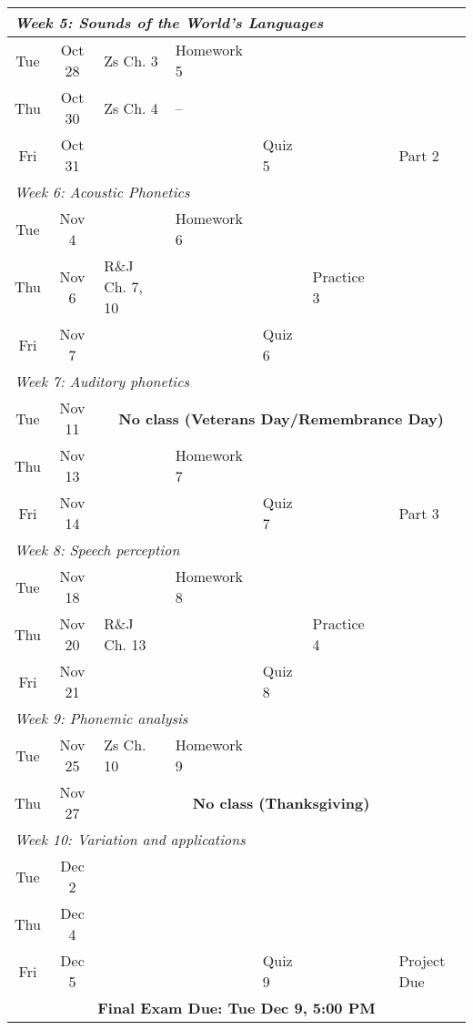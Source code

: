\documentclass[12pt, letterpaper]{article}
\begin{document}
\begin{longtable}{|c|c|l|p{3cm}|p{1.25cm}|l|l|l|}
\multicolumn{8}{|l|}{\textit{Week 5: Sounds of the World's Languages}} \\ \hline
Tue & Oct 28  & Zs Ch. 3 & Homework 5 & & & & \\ \hline
Thu & Oct 30  & Zs Ch. 4 & -- & & & & \\ \hline
Fri & Oct 31  & & & Quiz 5 & & & Part 2 \\ \hline

\multicolumn{8}{|l|}{\textit{Week 6: Acoustic Phonetics}} \\ \hline
Tue & Nov 4   &  & Homework 6 & & & & \\ \hline
Thu & Nov 6   & R\&J Ch. 7, 10 &  & & Practice 3 & & \\ \hline
Fri & Nov 7   & & & Quiz 6 & & & \\ \hline

\multicolumn{8}{|l|}{\textit{Week 7: Auditory phonetics}} \\ \hline
Tue & Nov 11  & \multicolumn{6}{c|}{\textbf{No class (Veterans Day/Remembrance Day)}} \\ \hline
Thu & Nov 13  &  & Homework 7 & & & & \\ \hline
Fri & Nov 14  & & & Quiz 7 & & & Part 3 \\ \hline

\multicolumn{8}{|l|}{\textit{Week 8: Speech perception}} \\ \hline
Tue & Nov 18  & & Homework 8 & & & & \\ \hline
Thu & Nov 20  & R\&J Ch. 13 & & & Practice 4 & & \\ \hline
Fri & Nov 21  & & & Quiz 8 & & & \\ \hline

\multicolumn{8}{|l|}{\textit{Week 9: Phonemic analysis }} \\ \hline
Tue & Nov 25  & Zs Ch. 10 & Homework 9 & & & & \\ \hline
Thu & Nov 27  & \multicolumn{6}{c|}{\textbf{No class (Thanksgiving)}} \\ \hline

\multicolumn{8}{|l|}{\textit{Week 10: Variation and applications}} \\ \hline
Tue & Dec 2   &  & & & & & \\ \hline
Thu & Dec 4   & & & &  & & \\ \hline
Fri & Dec 5   & & & Quiz 9 & & & Project Due \\ \hline

\multicolumn{8}{|c|}{\textbf{Final Exam Due: Tue Dec 9, 5:00 PM}} \\ \hline
\end{longtable}



\end{document}
